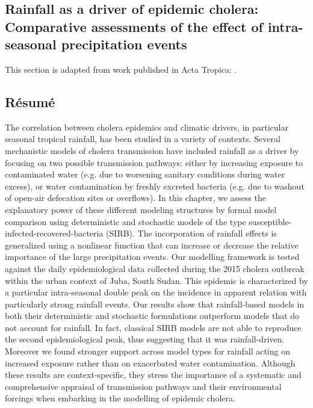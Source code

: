 \begin{fullwidth}
\chapter{Rainfall as a driver of epidemic cholera: Comparative assessments of the effect of intra-seasonal precipitation events}\label{ch:cholera-rainfall}
This section is adapted from work published in Acta Tropica:
.%


\section{Résumé}

The correlation between cholera epidemics and climatic drivers, in particular seasonal tropical rainfall, has been studied in a variety of contexts. Several mechanistic models of cholera transmission have included rainfall as a driver by focusing on two possible transmission pathways: either by increasing exposure to contaminated water (e.g. due to worsening sanitary conditions during water excess), or water contamination by freshly excreted bacteria (e.g. due to washout of open-air defecation sites or overflows). In this chapter, we assess the explanatory power of these different modeling structures by formal model comparison using deterministic and stochastic models of the type susceptible-infected-recovered-bacteria (SIRB). The incorporation of rainfall effects is generalized using a nonlinear function that can increase or decrease the relative importance of the large precipitation events. Our modelling framework is tested against the daily epidemiological data collected during the 2015 cholera outbreak within the urban context of Juba, South Sudan. This epidemic is characterized by a particular intra-seasonal double peak on the incidence in apparent relation with particularly strong rainfall events. Our results show that rainfall-based models in both their deterministic and stochastic formulations outperform models that do not account for rainfall. In fact, classical SIRB models are not able to reproduce the second epidemiological peak, thus suggesting that it was rainfall-driven. Moreover we found stronger support across model types for rainfall acting on increased exposure rather than on exacerbated water contamination. Although these results are context-specific, they stress the importance of a systematic and comprehensive appraisal of transmission pathways and their environmental forcings when embarking in the modelling of epidemic cholera.
\end{fullwidth}

